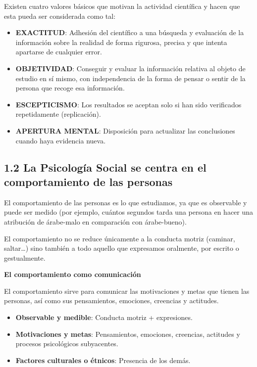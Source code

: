 \documentclass[
]{website}
\providecommand{\tightlist}{%
  \setlength{\itemsep}{0pt}\setlength{\parskip}{0pt}}
\begin{document}
Existen cuatro valores básicos que motivan la actividad científica y hacen que esta pueda ser considerada como tal:

\begin{itemize}
\tightlist
\item
  \textbf{EXACTITUD}: Adhesión del científico a una búsqueda y evaluación de la información sobre la realidad de forma rigurosa, precisa y que intenta apartarse de cualquier error.
\item
  \textbf{OBJETIVIDAD}: Conseguir y evaluar la información relativa al objeto de estudio en sí mismo, con independencia de la forma de pensar o sentir de la persona que recoge esa información.
\item
  \textbf{ESCEPTICISMO}: Los resultados se aceptan solo si han sido verificados repetidamente (replicación).
\item
  \textbf{APERTURA MENTAL}: Disposición para actualizar las conclusiones cuando haya evidencia nueva.
\end{itemize}

\subsection*{1.2 La Psicología Social se centra en el comportamiento de las personas}\label{subtema1_2}

El comportamiento de las personas es lo que estudiamos, ya que es observable y puede ser medido (por ejemplo, cuántos segundos tarda una persona en hacer una atribución de árabe-malo en comparación con árabe-bueno).

El comportamiento no se reduce únicamente a la conducta motriz (caminar, saltar\ldots) sino también a todo aquello que expresamos oralmente, por escrito o gestualmente.

\textbf{El comportamiento como comunicación}

El comportamiento sirve para comunicar las motivaciones y metas que tienen las personas, así como sus pensamientos, emociones, creencias y actitudes.

\begin{itemize}
\tightlist
\item
  \textbf{Observable y medible}: Conducta motriz + expresiones.
\item
  \textbf{Motivaciones y metas}: Pensamientos, emociones, creencias, actitudes y procesos psicológicos subyacentes.
\item
  \textbf{Factores culturales o étnicos}: Presencia de los demás.
\end{itemize}
\end{document}

